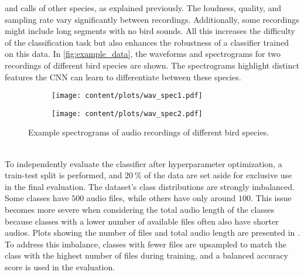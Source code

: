 and calls of other species, as explained previously. The loudness, quality, and sampling rate vary significantly between recordings. 
Additionally, some recordings might include long segments with no bird sounds. All this increases the difficulty of the classification task but also enhances the robustness of 
a classifier trained on this data.
In \autoref{fig:example_data}, the waveforms and spectrograms for two recordings of different bird species are shown. The spectrograms highlight distinct features the CNN can learn 
to differentiate between these species.
\begin{figure}
    \centering
    \begin{subfigure}[c]{0.45\textwidth}
        \centering
        \texttt{[image: content/plots/wav\_spec1.pdf]}
    \end{subfigure}
    \begin{subfigure}[c]{0.45\textwidth}
        \centering
        \texttt{[image: content/plots/wav\_spec2.pdf]}
    \end{subfigure}
    \caption{Example spectrograms of audio recordings of different bird species.}
    \label{fig:example_data}
\end{figure} \\
To independently evaluate the classifier after hyperparameter optimization, a train-test split is performed, and $\qty{20}{\percent}$ of the data are set aside for exclusive use in the
final evaluation.
The dataset's class distributions are strongly imbalanced.
Some classes have $\num{500}$ audio files, while others have only around $\num{100}$. 
This issue becomes more severe when considering the total audio length of the classes because classes with a lower number of available files often also have shorter audios. 
Plots showing the number of files and total audio length are presented in . To address this imbalance, classes with fewer files are upsampled to match the 
class with the highest number of files during training, and a balanced accuracy score is used in the evaluation.
\nopagebreak[4]

